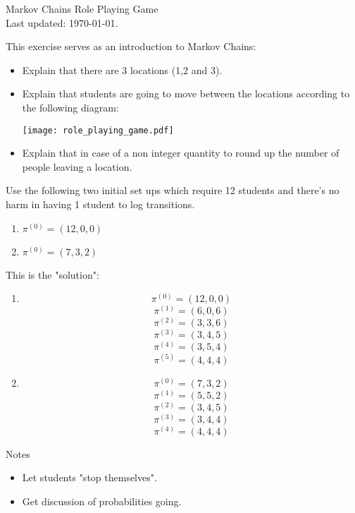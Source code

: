 \documentclass[12pt]{article}
\begin{document}
\begin{center}
\Huge{Markov Chains Role Playing Game}\\
\tiny{Last updated: \today.}
\end{center}

This exercise serves as an introduction to Markov Chains:
\begin{itemize}
\item Explain that there are 3 locations (1,2 and 3).
\item Explain that students are going to move between the locations according to the following diagram:
\begin{center}
\texttt{[image: role\_playing\_game.pdf]}
\end{center}
\item Explain that in case of a non integer quantity to round up the number of people leaving a location.
\end{itemize}

Use the following two initial set ups which require 12 students and there's no harm in having 1 student to log transitions.

\begin{enumerate}
\item $\pi^{(0)}=(12,0,0)$
\item $\pi^{(0)}=(7,3,2)$
\end{enumerate}

This is the "solution":

\begin{enumerate}
\item
$$\pi^{(0)}=(12,0,0)$$
$$\pi^{(1)}=(6,0,6)$$
$$\pi^{(2)}=(3,3,6)$$
$$\pi^{(3)}=(3,4,5)$$
$$\pi^{(4)}=(3,5,4)$$
$$\pi^{(5)}=(4,4,4)$$
\item
$$\pi^{(0)}=(7,3,2)$$
$$\pi^{(1)}=(5,5,2)$$
$$\pi^{(2)}=(3,4,5)$$
$$\pi^{(3)}=(3,4,4)$$
$$\pi^{(4)}=(4,4,4)$$
\end{enumerate}


Notes
\begin{itemize}
\item Let students "stop themselves".
\item Get discussion of probabilities going.
\end{itemize}
\end{document}
